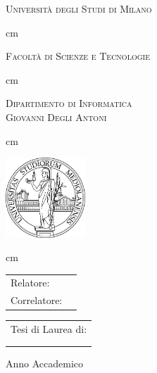 \begin{titlepage}

\begin{center}
	{\LARGE \textsc{Università degli Studi di Milano}}
	
	 cm

	{\large \textsc{Facoltà di Scienze e Tecnologie}}

	 cm
	
	{\large \textsc{Dipartimento di Informatica\\Giovanni Degli Antoni}}

	 cm
	
	\centerline{\includegraphics[height=30mm]{immagini/unimi}}
	
	 cm
	
	{\large \textsc{\myCDL}}

	\vfill

	{\Large \textsc{\myTitle}}
\end{center}

\vfill
		
\begin{tabular}{ll}
	{\large Relatore:} & \myRefereeA\\
	{\large Correlatore:} & \myRefereeB\\
\end{tabular}	

\vfill

\begin{flushright}
	\begin{tabular}{l}
		{\large Tesi di Laurea di:}\\
		{\large \myName}\\
		{\large \myMat}\\
	\end{tabular}	
\end{flushright}
	
\vspace*{\fill}

\begin{center}
	Anno Accademico \myYY
\end{center}

\end{titlepage}